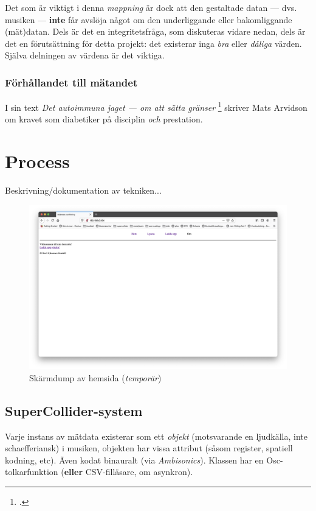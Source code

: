 \documentclass[11pt, twoside, a4paper]{article}
\begin{document}
\begin{multicols}{2}
Det som är viktigt i denna \emph{mappning} är dock att den gestaltade datan --- dvs. musiken --- \textbf{inte} får avslöja något om den underliggande eller bakomliggande (mät)datan. Dels är det en integritetsfråga, som diskuteras vidare nedan, dels är det en förutsättning för detta projekt: det existerar inga \emph{bra} eller \emph{dåliga} värden. Själva delningen av värdena är det viktiga.

\subsubsection*{Förhållandet till mätandet}
I sin text \emph{Det autoimmuna jaget --- om att sätta gränser} \footcite[286]{arvidson_det_2016} skriver Mats Arvidson om kravet som diabetiker på disciplin \emph{och} prestation.

\section*{Process}
Beskrivning/dokumentation av tekniken...


\begin{figure}
\centering
\includegraphics[width=\textwidth]{../media/hemsida.png}
\caption{Skärmdump av hemsida (\emph{temporär})}
\end{figure}

\subsection*{SuperCollider-system}
Varje instans av mätdata existerar som ett \emph{objekt} (motsvarande en ljudkälla, inte schaefferiansk) i musiken, objekten har vissa attribut (såsom register, spatiell kodning, etc). Även kodat binauralt (via \emph{Ambisonics}). Klassen har en Osc-tolkarfunktion (\textbf{eller} CSV-filläsare, om asynkron).


\end{multicols}
\end{document}
